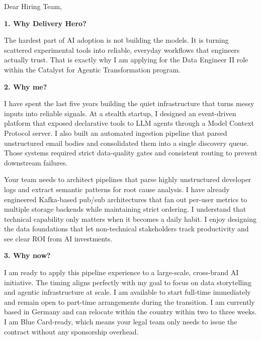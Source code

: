 \documentclass[11pt,a4paper]{coverletter}
\begin{document}

\opening{Dear Hiring Team,}

\vspace{8pt}\noindent\textbf{1. Why Delivery Hero?}\par\vspace{3pt}

The hardest part of AI adoption is not building the models. It is turning scattered experimental tools into reliable, everyday workflows that engineers actually trust. That is exactly why I am applying for the Data Engineer II role within the Catalyst for Agentic Transformation program.

\vspace{8pt}\noindent\textbf{2. Why me?}\par\vspace{3pt}

I have spent the last five years building the quiet infrastructure that turns messy inputs into reliable signals. At a stealth startup, I designed an event-driven platform that exposed declarative tools to LLM agents through a Model Context Protocol server. I also built an automated ingestion pipeline that parsed unstructured email bodies and consolidated them into a single discovery queue. Those systems required strict data-quality gates and consistent routing to prevent downstream failures.

Your team needs to architect pipelines that parse highly unstructured developer logs and extract semantic patterns for root cause analysis. I have already engineered Kafka-based pub/sub architectures that fan out per-user metrics to multiple storage backends while maintaining strict ordering. I understand that technical capability only matters when it becomes a daily habit. I enjoy designing the data foundations that let non-technical stakeholders track productivity and see clear ROI from AI investments.

\vspace{8pt}\noindent\textbf{3. Why now?}\par\vspace{3pt}

I am ready to apply this pipeline experience to a large-scale, cross-brand AI initiative. The timing aligns perfectly with my goal to focus on data storytelling and agentic infrastructure at scale. I am available to start full-time immediately and remain open to part-time arrangements during the transition. I am currently based in Germany and can relocate within the country within two to three weeks. I am Blue Card-ready, which means your legal team only needs to issue the contract without any sponsorship overhead.
\end{document}
